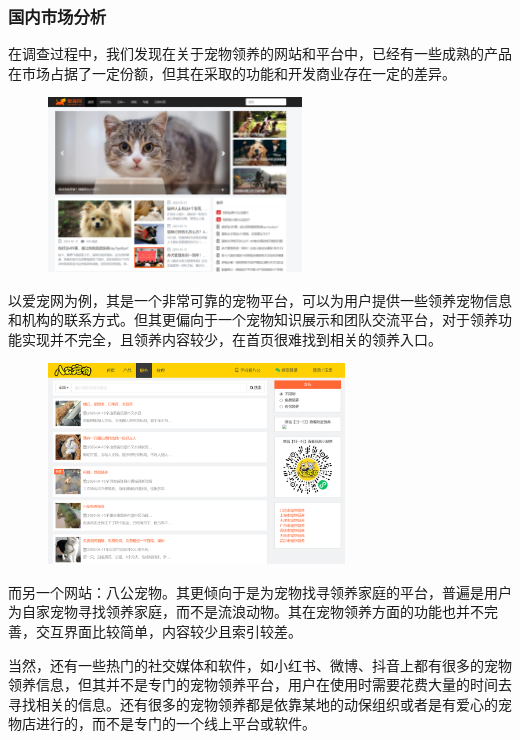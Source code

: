 \documentclass[12pt,a4paper,UTF8]{article}
\begin{document}
\subsubsection{国内市场分析}

在调查过程中，我们发现在关于宠物领养的网站和平台中，已经有一些成熟的产品在市场占据了一定份额，但其在采取的功能和开发商业存在一定的差异。

\begin{figure}[!htbp]
  \centering
  \includegraphics[width=0.6\textwidth]{figures/lovepetcn.png}
\end{figure}

以爱宠网为例，其是一个非常可靠的宠物平台，可以为用户提供一些领养宠物信息和机构的联系方式。但其更偏向于一个宠物知识展示和团队交流平台，对于领养功能实现并不完全，且领养内容较少，在首页很难找到相关的领养入口。

\begin{figure}[!htbp]
  \centering
  \includegraphics[width=0.7\textwidth]{figures/bagongpet.png}
\end{figure}

而另一个网站：八公宠物。其更倾向于是为宠物找寻领养家庭的平台，普遍是用户为自家宠物寻找领养家庭，而不是流浪动物。其在宠物领养方面的功能也并不完善，交互界面比较简单，内容较少且索引较差。

当然，还有一些热门的社交媒体和软件，如小红书、微博、抖音上都有很多的宠物领养信息，但其并不是专门的宠物领养平台，用户在使用时需要花费大量的时间去寻找相关的信息。还有很多的宠物领养都是依靠某地的动保组织或者是有爱心的宠物店进行的，而不是专门的一个线上平台或软件。
\end{document}

